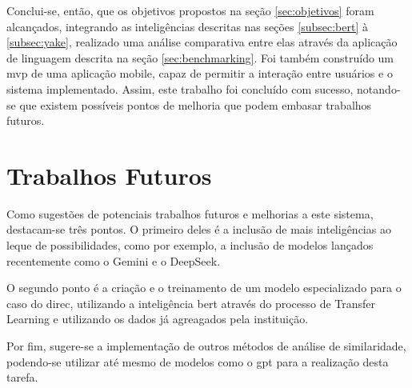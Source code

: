 Conclui-se, então, que os objetivos propostos na seção \ref{sec:objetivos} foram alcançados, integrando as inteligências descritas nas seções \ref{subsec:bert} à \ref{subsec:yake}, realizado uma análise comparativa entre elas através da aplicação de linguagem descrita na seção \ref{sec:benchmarking}. Foi também construído um \gls{mvp} de uma aplicação mobile, capaz de permitir a interação entre usuários e o sistema implementado. Assim, este trabalho foi concluído com sucesso, notando-se que existem possíveis pontos de melhoria que podem embasar trabalhos futuros.

\section{Trabalhos Futuros}\label{sec:futuro}

Como sugestões de potenciais trabalhos futuros e melhorias a este sistema, destacam-se três pontos. O primeiro deles é a inclusão de mais inteligências ao leque de possibilidades, como por exemplo, a inclusão de modelos lançados recentemente como o Gemini e o DeepSeek.

O segundo ponto é a criação e o treinamento de um modelo especializado para o caso do \gls{direc}, utilizando a inteligência \gls{bert} através do processo de Transfer Learning e utilizando os dados já agreagados pela instituição.

Por fim, sugere-se a implementação de outros métodos de análise de similaridade, podendo-se utilizar até mesmo de modelos como o \gls{gpt} para a realização desta tarefa.